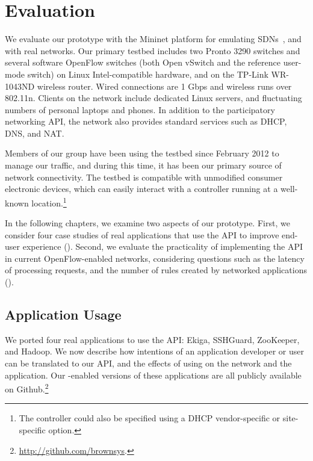 \chapter{Evaluation}
\label{sec:Evaluation}


We evaluate our \sys prototype with the Mininet platform for
emulating SDNs~\cite{Mininet}, and with real networks. Our primary
testbed includes two Pronto 3290 switches %
and several software OpenFlow switches (both Open vSwitch and the
reference user-mode switch) %
on Linux Intel-compatible
hardware, and on the TP-Link WR-1043ND wireless router.  Wired
connections are 1 Gbps and wireless runs over 802.11n. Clients on
the network include dedicated Linux servers, and fluctuating numbers
of personal laptops and phones. In addition to the participatory
networking API, the network also provides standard services such as
DHCP, DNS, and NAT.

Members of our group have been using the testbed since February 2012
to manage our traffic, and during this time, it has
been our primary source of network connectivity. The testbed is
compatible with unmodified consumer electronic devices, which can
easily interact with a \sys controller running at a well-known
location.\footnote{The \sys controller could also be specified using
a DHCP vendor-specific or site-specific option.}

In the following chapters, we examine two aspects of our prototype.
First, we consider four case studies of real applications
that use the \sys API to improve end-user experience
().  Second, we evaluate the practicality
of implementing the \sys API in current OpenFlow-enabled networks,
considering questions such as the latency of processing requests,
and the number of rules created by networked applications
().

\section{Application Usage}
\label{sec:ApplicationUsage}

We ported four real applications to use the \sys API: Ekiga,
SSHGuard, ZooKeeper, and Hadoop. We now describe how intentions of
an application developer or user can be translated to our API, and
the effects of using \sys on the network and the application. Our
\sys-enabled versions of these applications are all publicly
available on Github.\footnote{\url{http://github.com/brownsys}.}

